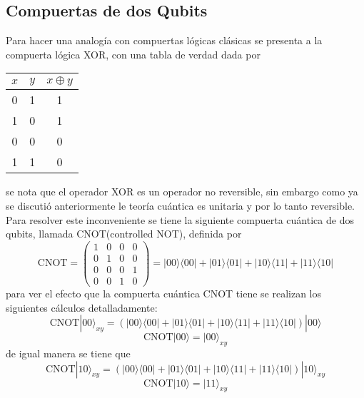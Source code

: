 \documentclass[a4paper]{article}
\begin{document}
\subsection{Compuertas de dos Qubits}
Para hacer una analogía con compuertas lógicas clásicas se presenta a la compuerta lógica XOR, con una tabla de verdad dada por 
\begin{center}
\begin{tabular}{ |c|c|c| } 
 \hline
 $x$ & $y$ & $x\oplus y$ \\ \hline
 0   & 1   &   1\\
 1   & 0   &   1\\
 0   & 0   &   0\\
 1   & 1   &   0\\ 
 \hline
\end{tabular}
\end{center}
se nota que el operador XOR es un operador no reversible, sin embargo como ya se discutió anteriormente le teoría cuántica es unitaria y por lo tanto reversible. Para resolver este inconveniente se tiene la siguiente compuerta cuántica de dos qubits, llamada CNOT(controlled NOT), definida por
\begin{equation}
\text{CNOT}=
	\begin{pmatrix}
		1 & 0 & 0 & 0 \\
		0 & 1 & 0 & 0 \\
		0 & 0 & 0 & 1 \\
		0 & 0 & 1 & 0
	\end{pmatrix}=|00\rangle\langle 00|+|01\rangle\langle 01|+|10\rangle\langle 11|+|11\rangle\langle 10|
\end{equation}
para ver el efecto que la compuerta cuántica CNOT tiene se realizan los siguientes cálculos detalladamente:
\begin{equation}
\text{CNOT}|00\rangle_{xy}=(|00\rangle\langle 00|+|01\rangle\langle 01|+|10\rangle\langle 11|+|11\rangle\langle 10|)|00\rangle
\end{equation}
\begin{equation*}
\text{CNOT}|00\rangle=|00\rangle_{xy}
\end{equation*}
de igual manera se tiene que 
\begin{equation}
\text{CNOT}|10\rangle_{xy}=(|00\rangle\langle 00|+|01\rangle\langle 01|+|10\rangle\langle 11|+|11\rangle\langle 10|)|10\rangle_{xy}
\end{equation}
\begin{equation*}
\text{CNOT}|10\rangle=|11\rangle_{xy}
\end{equation*}
\end{document}
